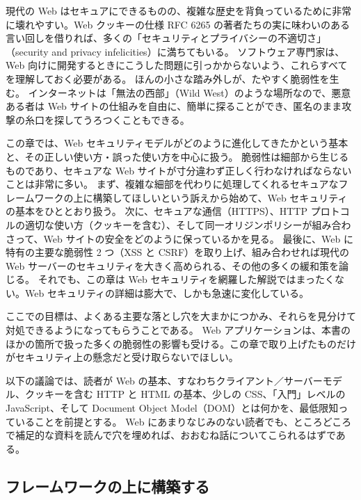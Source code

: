 \documentclass[uplatex]{jsarticle}
\def\label#1{}%
\begin{document}
現代の Web はセキュアにできるものの、複雑な歴史を背負っているために非常に壊れやすい。Web クッキーの仕様 RFC 6265 の著者たちの実に味わいのある言い回しを借りれば、多くの「セキュリティとプライバシーの不適切さ」（security and privacy infelicities）に満ちてもいる。
ソフトウェア専門家は、Web 向けに開発するときにこうした問題に引っかからないよう、これらすべてを理解しておく必要がある。
ほんの小さな踏み外しが、たやすく脆弱性を生む。
インターネットは「無法の西部」（Wild West）のような場所なので、悪意ある者は Web サイトの仕組みを自由に、簡単に探ることができ、匿名のまま攻撃の糸口を探してうろつくこともできる。

この章では、Web セキュリティモデルがどのように進化してきたかという基本と、その正しい使い方・誤った使い方を中心に扱う。
脆弱性は細部から生じるものであり、セキュアな Web サイトが寸分違わず正しく行わなければならないことは非常に多い。
まず、複雑な細部を代わりに処理してくれるセキュアなフレームワークの上に構築してほしいという訴えから始めて、Web セキュリティの基本をひととおり扱う。
次に、セキュアな通信（HTTPS）、HTTP プロトコルの適切な使い方（クッキーを含む）、そして同一オリジンポリシーが組み合わさって、Web サイトの安全をどのように保っているかを見る。
最後に、Web に特有の主要な脆弱性 2 つ（XSS と CSRF）を取り上げ、組み合わせれば現代の Web サーバーのセキュリティを大きく高められる、その他の多くの緩和策を論じる。
それでも、この章は Web セキュリティを網羅した解説ではまったくない。Web セキュリティの詳細は膨大で、しかも急速に変化している。

ここでの目標は、よくある主要な落とし穴を大まかにつかみ、それらを見分けて対処できるようになってもらうことである。
Web アプリケーションは、本書のほかの箇所で扱った多くの脆弱性の影響も受ける。この章で取り上げたものだけがセキュリティ上の懸念だと受け取らないでほしい。

\begin{rem}[前提とする知識]\label{rem:ch11-prerequisites}
以下の議論では、読者が Web の基本、すなわちクライアント／サーバーモデル、クッキーを含む HTTP と HTML の基本、少しの CSS、「入門」レベルの JavaScript、そして Document Object Model（DOM）とは何かを、最低限知っていることを前提とする。
Web にあまりなじみのない読者でも、ところどころで補足的な資料を読んで穴を埋めれば、おおむね話についてこられるはずである。
\end{rem}

\subsection{フレームワークの上に構築する}\label{subsec:ch11-framework}
\end{document}
